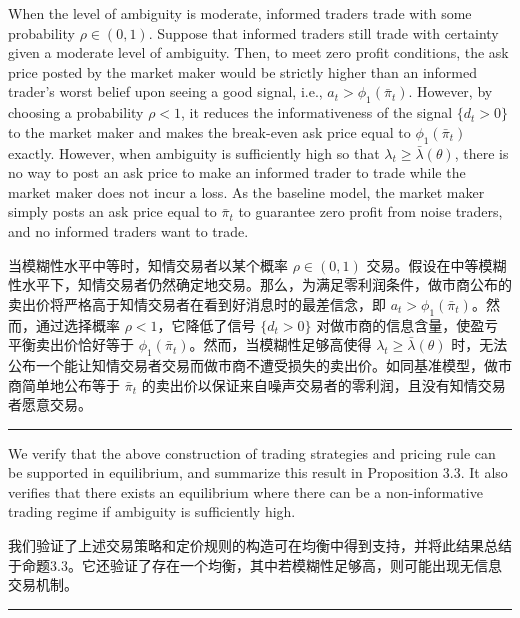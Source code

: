\documentclass[12pt,a4paper]{article}
\newenvironment{original}{%
  \par\vspace{4pt}\noindent%
  \color{black}%
  \ignorespaces
}{%
  \par\vspace{2pt}%
}
\newenvironment{translation}{%
  \par\vspace{2pt}\noindent%
  \color{transblue}%
  \ignorespaces
}{%
  \par\vspace{4pt}\hrule\vspace{6pt}%
}
\begin{document}
\begin{original}
When the level of ambiguity is moderate, informed traders trade with some probability $\rho \in (0, 1)$. Suppose that informed traders still trade with certainty given a moderate level of ambiguity. Then, to meet zero profit conditions, the ask price posted by the market maker would be strictly higher than an informed trader's worst belief upon seeing a good signal, i.e., $a_t > \phi_1(\bar{\pi}_t)$. However, by choosing a probability $\rho < 1$, it reduces the informativeness of the signal $\{d_t > 0\}$ to the market maker and makes the break-even ask price equal to $\phi_1(\bar{\pi}_t)$ exactly. However, when ambiguity is sufficiently high so that $\lambda_t \geq \bar{\lambda}(\theta)$, there is no way to post an ask price to make an informed trader to trade while the market maker does not incur a loss. As the baseline model, the market maker simply posts an ask price equal to $\bar{\pi}_t$ to guarantee zero profit from noise traders, and no informed traders want to trade.
\end{original}
\begin{translation}
当模糊性水平中等时，知情交易者以某个概率 $\rho \in (0, 1)$ 交易。假设在中等模糊性水平下，知情交易者仍然确定地交易。那么，为满足零利润条件，做市商公布的卖出价将严格高于知情交易者在看到好消息时的最差信念，即 $a_t > \phi_1(\bar{\pi}_t)$。然而，通过选择概率 $\rho < 1$，它降低了信号 $\{d_t > 0\}$ 对做市商的信息含量，使盈亏平衡卖出价恰好等于 $\phi_1(\bar{\pi}_t)$。然而，当模糊性足够高使得 $\lambda_t \geq \bar{\lambda}(\theta)$ 时，无法公布一个能让知情交易者交易而做市商不遭受损失的卖出价。如同基准模型，做市商简单地公布等于 $\bar{\pi}_t$ 的卖出价以保证来自噪声交易者的零利润，且没有知情交易者愿意交易。
\end{translation}

\begin{original}
We verify that the above construction of trading strategies and pricing rule can be supported in equilibrium, and summarize this result in Proposition 3.3. It also verifies that there exists an equilibrium where there can be a non-informative trading regime if ambiguity is sufficiently high.
\end{original}
\begin{translation}
我们验证了上述交易策略和定价规则的构造可在均衡中得到支持，并将此结果总结于命题3.3。它还验证了存在一个均衡，其中若模糊性足够高，则可能出现无信息交易机制。
\end{translation}
\end{document}
